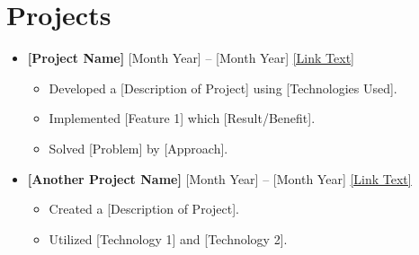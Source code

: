 \documentclass[letterpaper,10pt]{article}
\begin{document}
\section*{Projects}
\vspace{5pt}
\color{textgray}
\begin{itemize}
    \item \textbf{[Project Name]} \hfill [Month Year] -- [Month Year]
          \newline \href{[Link to Project (e.g., GitHub)]}{[Link Text]}
          \begin{itemize}[label=$\bullet$]
              \item Developed a [Description of Project] using [Technologies Used].
              \item Implemented [Feature 1] which [Result/Benefit].
              \item Solved [Problem] by [Approach].
          \end{itemize}
    \item \textbf{[Another Project Name]} \hfill [Month Year] -- [Month Year]
          \newline \href{[Link to Project (e.g., GitHub)]}{[Link Text]}
          \begin{itemize}[label=$\bullet$]
              \item Created a [Description of Project].
              \item Utilized [Technology 1] and [Technology 2].
          \end{itemize}
\end{itemize}
\end{document}
